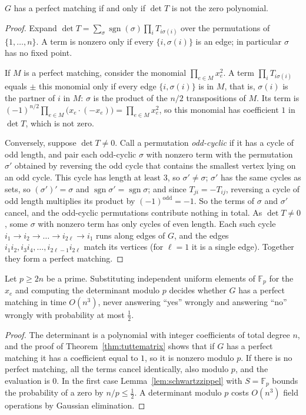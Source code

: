 \begin{theorem}[Tutte, 1947]\label{thm:tuttematrix}
$G$ has a perfect matching if and only if $\det T$ is not the zero polynomial.
\end{theorem}
\begin{proof}
Expand $\det T=\sum_\sigma\operatorname{sgn}(\sigma)\prod_iT_{i\sigma(i)}$ over the permutations of $\{1,\dots,n\}$. A term is nonzero only if every $\{i,\sigma(i)\}$ is an edge; in particular $\sigma$ has no fixed point.

If $M$ is a perfect matching, consider the monomial $\prod_{e\in M}x_e^2$. A term $\prod_iT_{i\sigma(i)}$ equals $\pm$ this monomial only if every edge $\{i,\sigma(i)\}$ is in $M$, that is, $\sigma(i)$ is the partner of $i$ in $M$: $\sigma$ is the product of the
$n/2$ transpositions of $M$. Its term is $(-1)^{n/2}\prod_{e\in M}\bigl(x_e\cdot(-x_e)\bigr)=\prod_{e\in M}x_e^2$, so this monomial has coefficient $1$ in $\det T$, which is not zero.

Conversely, suppose $\det T\ne0$. Call a permutation \emph{odd-cyclic} if it has a cycle of odd length, and pair each odd-cyclic $\sigma$ with nonzero term with the permutation $\sigma'$ obtained by reversing the odd cycle that contains the
smallest vertex lying on an odd cycle. This cycle has length at least $3$, so $\sigma'\ne\sigma$; $\sigma'$ has the same cycles as sets, so $(\sigma')'=\sigma$ and $\operatorname{sgn}\sigma'=\operatorname{sgn}\sigma$; and since $T_{ji}=-T_{ij}$, reversing a cycle of odd length
multiplies its product by $(-1)^{\text{odd}}=-1$. So the terms of $\sigma$ and $\sigma'$ cancel, and the odd-cyclic permutations contribute nothing in total. As $\det T\ne0$, some $\sigma$ with nonzero term has only cycles of even length. Each such cycle
$i_1\to i_2\to\dots\to i_{2\ell}\to i_1$ runs along edges of $G$, and the edges $i_1i_2,i_3i_4,\dots,i_{2\ell-1}i_{2\ell}$ match its vertices (for $\ell=1$ it is a single edge). Together they form a perfect matching.
\end{proof}

\begin{corollary}\label{cor:lovasz}
Let $p\ge2n$ be a prime. Substituting independent uniform elements of $\mathbb F_p$ for the $x_e$ and computing the determinant modulo $p$ decides whether $G$ has a perfect matching in time $O(n^3)$, never answering ``yes'' wrongly and
answering ``no'' wrongly with probability at most $\tfrac12$.
\end{corollary}
\begin{proof}
The determinant is a polynomial with integer coefficients of total degree $n$, and the proof of Theorem~\ref{thm:tuttematrix} shows that if $G$ has a perfect matching it has a coefficient equal to $1$, so it is nonzero modulo $p$. If there is no perfect matching, all the
terms cancel identically, also modulo $p$, and the evaluation is $0$. In the first case Lemma~\ref{lem:schwartzzippel} with $S=\mathbb F_p$ bounds the probability of a zero by $n/p\le\frac12$. A determinant modulo $p$ costs $O(n^3)$ field operations by Gaussian elimination.
\end{proof}

